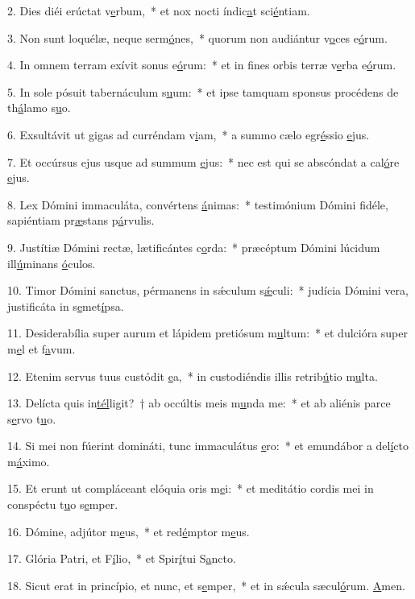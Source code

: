 2. Dies diéi erúctat v\uline{e}rbum,~* et nox nocti índic\uline{a}t sci\uline{é}ntiam.\par 
3. Non sunt loquélæ, neque serm\uline{ó}nes,~* quorum non audiántur v\uline{o}ces e\uline{ó}rum.\par 
4. In omnem terram exívit sonus e\uline{ó}rum:~* et in fines orbis terræ v\uline{e}rba e\uline{ó}rum.\par 
5. In sole pósuit tabernáculum s\uline{u}um:~* et ipse tamquam sponsus procédens de th\uline{á}lamo s\uline{u}o.\par 
6. Exsultávit ut gigas ad curréndam v\uline{i}am,~* a summo cælo egr\uline{é}ssio \uline{e}jus.\par 
7. Et occúrsus ejus usque ad summum \uline{e}jus:~* nec est qui se abscóndat a cal\uline{ó}re \uline{e}jus.\par 
8. Lex Dómini immaculáta, convértens \uline{á}nimas:~* testimónium Dómini fidéle, sapiéntiam pr\uline{æ}stans p\uline{á}rvulis.\par 
9. Justítiæ Dómini rectæ, lætificántes c\uline{o}rda:~* præcéptum Dómini lúcidum ill\uline{ú}minans \uline{ó}culos.\par 
10. Timor Dómini sanctus, pérmanens in sǽculum s\uline{ǽ}culi:~* judícia Dómini vera, justificáta in s\uline{e}met\uline{í}psa.\par 
11. Desiderabília super aurum et lápidem pretiósum m\uline{u}ltum:~* et dulcióra super m\uline{e}l et f\uline{a}vum.\par 
12. Etenim servus tuus custódit \uline{e}a,~* in custodiéndis illis retrib\uline{ú}tio m\uline{u}lta.\par 
13. Delícta quis in\uline{tél}ligit?~† ab occúltis meis m\uline{u}nda me:~* et ab aliénis parce s\uline{e}rvo t\uline{u}o.\par 
14. Si mei non fúerint domináti, tunc immaculátus \uline{e}ro:~* et emundábor a del\uline{í}cto m\uline{á}ximo.\par 
15. Et erunt ut compláceant elóquia oris m\uline{e}i:~* et meditátio cordis mei in conspéctu t\uline{u}o s\uline{e}mper.\par 
16. Dómine, adjútor m\uline{e}us,~* et red\uline{é}mptor m\uline{e}us.\par 
17. Glória Patri, et F\uline{í}lio,~* et Spir\uline{í}tui S\uline{a}ncto.\par 
18. Sicut erat in princípio, et nunc, et s\uline{e}mper,~* et in sǽcula sæcul\uline{ó}rum. \uline{A}men.\par 
